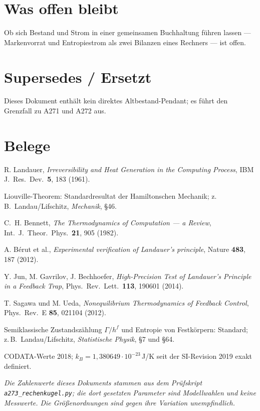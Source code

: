 \section{Was offen bleibt}

Ob sich Bestand und Strom in einer gemeinsamen Buchhaltung führen lassen ---
Markenvorrat und Entropiestrom als zwei Bilanzen eines Rechners --- ist offen.

\section{Supersedes / Ersetzt}

Dieses Dokument enthält kein direktes Altbestand-Pendant; es führt den Grenzfall
zu A271 und A272 aus.

\clearpage
{}
{}
\section*{Belege}

\begingroup
\small
\begin{description}[leftmargin=3.2em,style=sameline,itemsep=0.3em]

\item[{[B1]}] R. Landauer, \emph{Irreversibility and Heat Generation in the
Computing Process}, IBM J.\ Res.\ Dev.\ \textbf{5}, 183 (1961).

\item[{[B2]}] Liouville-Theorem: Standardresultat der Hamiltonschen Mechanik;
z.\,B.\ Landau/Lifschitz, \emph{Mechanik}, §46.

\item[{[B3]}] C.~H. Bennett, \emph{The Thermodynamics of Computation --- a
Review}, Int.\ J.\ Theor.\ Phys.\ \textbf{21}, 905 (1982).

\item[{[B4]}] A. Bérut et al., \emph{Experimental verification of Landauer's
principle}, Nature \textbf{483}, 187 (2012).

\item[{[B5]}] Y. Jun, M. Gavrilov, J. Bechhoefer, \emph{High-Precision Test of
Landauer's Principle in a Feedback Trap}, Phys.\ Rev.\ Lett.\ \textbf{113},
190601 (2014).

\item[{[B6]}] T. Sagawa und M. Ueda, \emph{Nonequilibrium Thermodynamics of
Feedback Control}, Phys.\ Rev.\ E \textbf{85}, 021104 (2012).

\item[{[B7]}] Semiklassische Zustandszählung $\Gamma/h^f$ und Entropie von
Festkörpern: Standard; z.\,B.\ Landau/Lifschitz, \emph{Statistische Physik}, §7
und §64.

\item[{[B8]}] CODATA-Werte 2018; $k_B = 1{,}380649\cdot10^{-23}$\,J/K seit der
SI-Revision 2019 exakt definiert.

\end{description}
\endgroup

\vspace{1em}
\noindent
{\small\itshape Die Zahlenwerte dieses Dokuments stammen aus dem Prüfskript
\texttt{a273\_rechenkugel.py}; die dort gesetzten Parameter sind Modellwahlen und
keine Messwerte. Die Größenordnungen sind gegen ihre Variation unempfindlich.}
